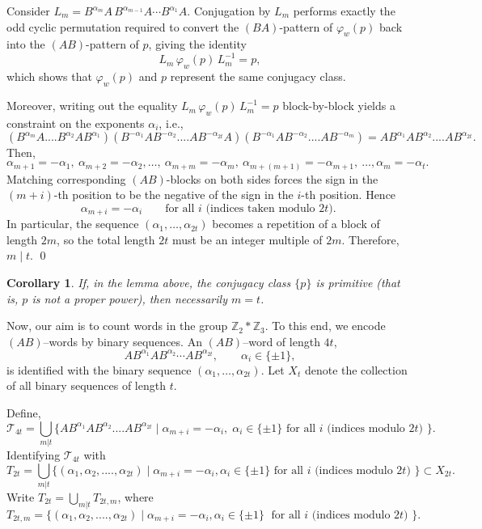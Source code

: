 \documentclass[a4paper,12pt]{amsart}
\renewenvironment{proof}{{\bfseries Proof.}}{\qed}
\numberwithin{equation}{section}
\newtheorem{cor}[theorem]{Corollary}
\theoremstyle{definition}
\numberwithin{equation}{section}
\begin{document}
\begin{proof}
Consider $L_m = B^{\alpha_m}A\, B^{\alpha_{m-1}}A \cdots B^{\alpha_1}A$. Conjugation by $L_m$ performs exactly the odd cyclic permutation 
required to convert the $(BA)$-pattern of $\varphi_{w}(p)$ back into the $(AB)$-pattern of 
$p$, giving the identity
\[
L_m\,\varphi_{w}(p)\,L_m^{-1} = p,
\]
which shows that $\varphi_{w}(p)$ and $p$ represent the same conjugacy class.

Moreover, writing out the equality $L_m\,\varphi_{w}(p)\,L_m^{-1} = p$ block-by-block yields a 
constraint on the exponents $\alpha_i$, i.e.,
$$ 
(B^{\alpha_m}A....B^{\alpha_2}AB^{\alpha_1})(B^{-\alpha_1}AB^{-\alpha_2}....AB^{-\alpha_{2t}}A)(B^{-\alpha_1}AB^{-\alpha_2}....AB^{-\alpha_m}) = AB^{\alpha_1}AB^{\alpha_2}....AB^{\alpha_{2t}}.
 $$   
 Then, $$\alpha_{m+1} = -\alpha_1,
 ~\alpha_{m+2} = -\alpha_2,
 \ldots, ~\alpha_{m+m} = -\alpha_m,~
 \alpha_{m+(m+1)} = -\alpha_{m+1},~
 \ldots, \alpha_{m} = -\alpha_t.$$
Matching corresponding $(AB)$-blocks on both sides 
forces the sign in the $(m+i)$-th position to be the negative of the sign in the $i$-th 
position. Hence
\[
\alpha_{m+i} = -\alpha_i \qquad \text{for all } i \text{ (indices taken modulo $2t$). }
\]
In particular, the sequence $(\alpha_1,\ldots,\alpha_{2t})$ becomes a repetition of a block of 
length $2m$, so the total length $2t$ must be an integer multiple of $2m$. Therefore, $m \mid t$.
\end{proof}
\begin{cor}\label{2.2}
If, in the lemma above, the conjugacy class $\{p\}$ is primitive (that is,
$p$ is not a proper power), then necessarily $m=t$.  
\end{cor}

Now, our aim is to count words in the group $\mathbb Z_2 * \mathbb Z_3$.
To this end, we encode $(AB)$--words by binary sequences.
An $(AB)$--word of length $4t$, $$ AB^{\alpha_1}AB^{\alpha_2}\cdots AB^{\alpha_{2t}},\qquad \alpha_i\in\{\pm1\},$$is identified with the binary sequence $(\alpha_1,\ldots,\alpha_{2t})$. Let $X_t$ denote the collection of all binary sequences of length $t$.

 Define, 
 $$\mathcal{T}_{4t}=\bigcup_{m \lvert t}
 \{ AB^{\alpha_1}AB^{\alpha_2}....AB^{\alpha_{2t}} \mid \alpha_{m+i} = -\alpha_i, \; \alpha_i\in\{\pm1\} \text{ for all $i$ (indices modulo $2t$) }\}.$$
 Identifying $\mathcal{T}_{4t}$ with 
$$ T_{2t} =\bigcup_{m|t}\{(\alpha_1,\alpha_2,....,\alpha_{2t}) \mid  \alpha_{m+i}=-\alpha_i, \alpha_i\in\{\pm1\}\text{ for all $i$ (indices modulo $2t$) }\} \subset X_{2t}. $$  Write $T_{2t} = \bigcup_{m\lvert t}T_{2t,m}$,   where 
$$ T_{2t,m} = \{(\alpha_1,\alpha_2,....,\alpha_{2t}) \mid  \alpha_{m+i}=-\alpha_i, \alpha_i\in\{\pm1\}\;\text{ for all $i$ (indices modulo $2t$) }\}.$$ 
\end{document}
